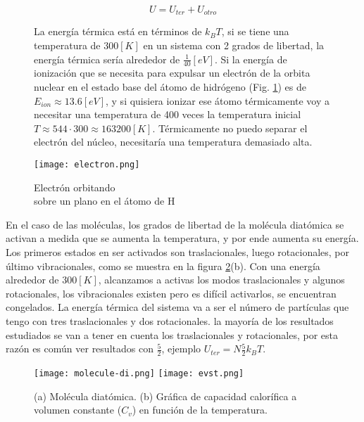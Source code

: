 \documentclass[11pt,fleqn]{book}
\begin{document}
\begin{equation*}
    U=U_{ter}+U_{otro}
\end{equation*}

\begin{figure}[H]
    \begin{minipage}[c]{0.6\linewidth}
    \hspace{5mm} La energía térmica está en términos de $k_{B}T$, si se tiene una temperatura de $300[K]$ en un sistema con 2 grados de libertad, la energía térmica sería alrededor de $\frac{1}{40}[eV]$. Si la energía de ionización que se necesita para expulsar un electrón de la  orbita nuclear en el estado base del átomo de hidrógeno (Fig. \ref{Fig. 1.3}) es de $E_{ion}\approx13.6 [eV]$, y si quisiera ionizar ese átomo térmicamente voy a necesitar una temperatura de 400 veces la temperatura inicial $T\approx544\cdot300\approx163200[K]$. Térmicamente no puedo separar el electrón del núcleo, necesitaría una temperatura demasiado alta. 
    \end{minipage}\hspace{7mm}
    \begin{minipage}[c]{0.5\linewidth}
    \texttt{[image: electron.png]}
    \caption{Electrón orbitando\\ sobre un plano en el átomo de H}
    \label{Fig. 1.3}
    \end{minipage}
\end{figure}
\vspace{-5mm} 

En  el caso de las moléculas, los grados de libertad de la molécula diatómica se activan a medida que se aumenta la temperatura, y por ende aumenta su energía. Los primeros estados en ser activados son traslacionales, luego rotacionales, por último vibracionales, como se muestra en la figura \ref{Fig. 1.4}(b). Con una energía alrededor de $300 [K]$, alcanzamos a activas los modos traslacionales y algunos rotacionales, los vibracionales existen pero es difícil activarlos, se encuentran congelados. La energía térmica del sistema va a ser el número de partículas que tengo con tres traslacionales y dos rotacionales. la mayoría de los resultados estudiados se van a tener en cuenta los traslacionales y rotacionales, por esta razón es común ver resultados con $\frac{5}{2}$, ejemplo $U_{ter}=N\frac{5}{2}k_{B}T$. 

\begin{figure}[H]
    \centering
    \texttt{[image: molecule-di.png]}\hspace{2cm}
    \texttt{[image: evst.png]}
    \caption{(a) Molécula diatómica. (b) Gráfica de capacidad calorífica a volumen constante ($C_{v}$) en función de la temperatura.}
    \label{Fig. 1.4}
\end{figure} 
\end{document}
